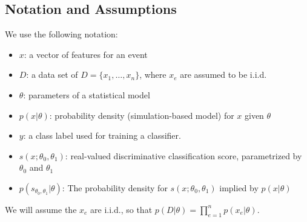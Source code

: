\documentclass[aoas,preprint]{imsart}
\numberwithin{equation}{section}
\theoremstyle{plain}
\begin{document}
%


  

\subsection{Notation and Assumptions}

We use the following notation:
\begin{itemize}
 \item $x$: a vector of features for an event
 \item $D$: a data set of $D=\{x_1, \dots, x_n\}$, where $x_e$ are assumed to be i.i.d.
 \item $\theta$: parameters of a statistical model
\item $p(x| \theta)$:  probability density  (simulation-based model) for $x$ given $\theta$
\item $y$: a class label used for training a classifier.
\item $s(x;\theta_0, \theta_1)$: real-valued discriminative classification score, parametrized by $\theta_0$ and $\theta_1$
\item $p( s_{\theta_0, \theta_1} | \theta )$: The probability density  for $s(x; \theta_0, \theta_1)$ implied by $p(x|\theta)$ 
\end{itemize}
We will assume the $x_e$ are i.i.d., so that $p(D|\theta) = \prod_{e=1}^n p(x_e | \theta)$.
\end{document}
